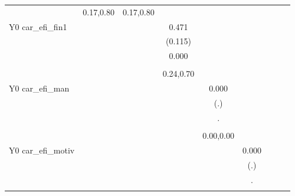 \begin{table}[!h]
\begin{adjustbox}{width=\columnwidth,center}
\begin{tabular}{l*{8}{c}}
                    &   0.17,0.80         &   0.17,0.80         &                     &                     &                     \\
Y0 car\_efi\_fin1     &                     &                     &       0.471\sym{***}&                     &                     \\
                    &                     &                     &     (0.115)         &                     &                     \\
                    &                     &                     &       0.000         &                     &                     \\
                    &                     &                     &                     &                     &                     \\
                    &                     &                     &   0.24,0.70         &                     &                     \\
Y0 car\_efi\_man      &                     &                     &                     &       0.000         &                     \\
                    &                     &                     &                     &         (.)         &                     \\
                    &                     &                     &                     &           .         &                     \\
                    &                     &                     &                     &                     &                     \\
                    &                     &                     &                     &   0.00,0.00         &                     \\
Y0 car\_efi\_motiv    &                     &                     &                     &                     &       0.000         \\
                    &                     &                     &                     &                     &         (.)         \\
                    &                     &                     &                     &                     &           .         \\
                    &                     &                     &                     &                     &                     \\

\end{tabular}
\end{adjustbox}
\end{table}

